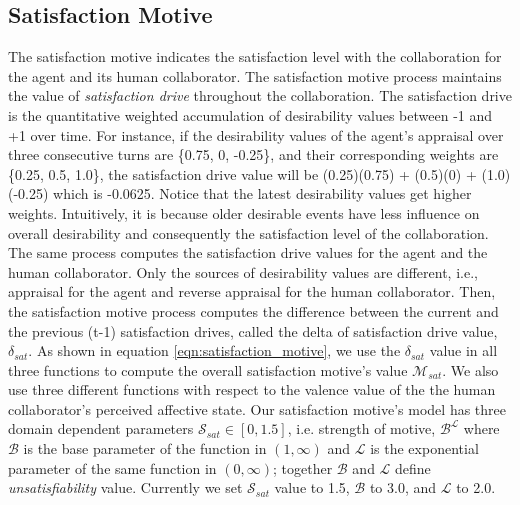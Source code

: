 \documentclass[12pt]{report}
\begin{document}
\subsection{Satisfaction Motive}
The satisfaction motive indicates the satisfaction level with the collaboration
for the agent and its human collaborator. The satisfaction motive process maintains
the value of \textit{satisfaction drive} throughout the collaboration. The
satisfaction drive is the quantitative weighted accumulation of desirability
values between -1 and +1 over time. For instance, if the desirability values of
the agent's appraisal over three consecutive turns are \{0.75, 0, -0.25\}, and
their corresponding weights are \{0.25, 0.5, 1.0\}, the satisfaction drive value
will be (0.25)(0.75) + (0.5)(0) + (1.0)(-0.25) which is -0.0625. Notice that
the latest desirability values get higher weights. Intuitively, it is because
older desirable events have less influence on overall desirability and
consequently the satisfaction level of the collaboration. The same process
computes the satisfaction drive values for the agent and the human collaborator.
Only the sources of desirability values are different, i.e., appraisal for the
agent and reverse appraisal for the human collaborator. Then, the satisfaction
motive process computes the difference between the current and the previous
(t-1) satisfaction drives, called the delta of satisfaction drive value,
$\delta_{sat}$. As shown in equation \ref{eqn:satisfaction_motive}, we use the
$\delta_{sat}$ value in all three functions to compute the overall satisfaction
motive's value $\mathcal{M}_{sat}$. We also use three different functions with
respect to the valence value of the the human collaborator's perceived affective
state. Our satisfaction motive's model has three domain dependent parameters
$\mathcal{S}_{sat} \in [0, 1.5]$, i.e. strength of motive,
$\mathcal{B}^\mathcal{L}$ where $\mathcal{B}$ is the base parameter of the
function in $(1,\infty)$ and $\mathcal{L}$ is the exponential parameter of the
same function in $(0, \infty)$; together $\mathcal{B}$ and $\mathcal{L}$ define
\textit{unsatisfiability} value. Currently we set $\mathcal{S}_{sat}$ value to
1.5, $\mathcal{B}$ to 3.0, and $\mathcal{L}$ to 2.0.
\end{document}
